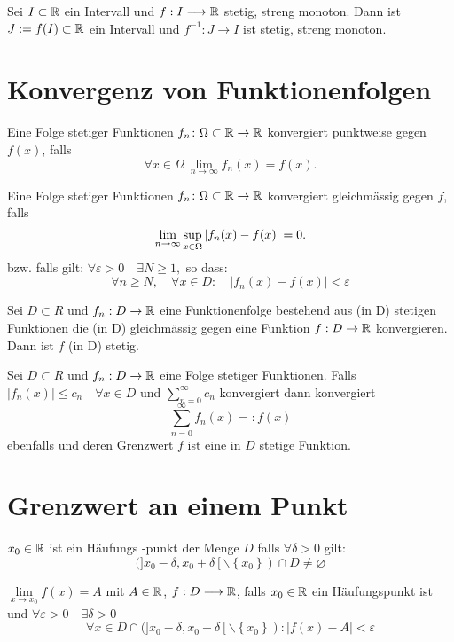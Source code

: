 \Satz[Umkehrabbildung] Sei $I \subset \mathbb{R}$ ein Intervall und $f: I \longrightarrow \mathbb{R}$ stetig, streng monoton. Dann ist $J:=f(I) \subset \mathbb{R}$ ein Intervall und $f^{-1}: J \longrightarrow I$ ist stetig, streng monoton.

\section{Konvergenz von Funktionenfolgen}

\Def[Punktweise] Eine Folge stetiger Funktionen $f_n\colon\Omega\subset\mathbb{R}\to\mathbb{R}$
konvergiert punktweise gegen $f(x)$, falls
\[
\forall x\in\Omega \ \lim_{n\to\infty} f_n(x) = f(x).
\]

\Def[Gleichmässig] Eine Folge stetiger Funktionen $f_n\colon\Omega\subset\mathbb{R}\to\mathbb{R}$
konvergiert gleichmässig gegen $f$, falls
\[
\lim_{n\to\infty} \sup_{x\in\Omega} \left\lvert f_n(x)-f(x) \right\rvert = 0.
\]
bzw. falls gilt: $\forall \varepsilon>0  \quad \exists N \geqslant 1,$ so dass:
$$
\forall n \geqslant N, \quad \forall x \in D: \quad\left|f_{n}(x)-f(x)\right|<\varepsilon
$$

 Sei $D \subset R$ und $f_{n}: D \rightarrow \mathbb{R}$ eine Funktionenfolge bestehend aus (in
D) stetigen Funktionen die (in D) gleichmässig gegen eine Funktion $f: D \rightarrow \mathbb{R}$ konvergieren. Dann ist $f$ (in D) stetig.

 Sei $D \subset R$ und $f_{n}: D \rightarrow \mathbb{R}$ eine Folge stetiger Funktionen. Falls  $\left|f_{n}(x)\right| \leqslant c_{n} \quad \forall x \in D$ und $\sum_{n=0}^{\infty} c_{n}$ konvergiert dann konvergiert 
$$\sum\limits_{n=0}^{\infty} f_n(x)  =: f(x)$$
ebenfalls und deren Grenzwert $f$ ist eine in $D$ stetige Funktion.

\section{Grenzwert an einem Punkt}

\Def[Häufungspunkt] $x_{0} \in \mathbb{R}$ ist ein Häufungs -punkt der Menge $D$ falls $\forall \delta>0$ gilt:
$$(]x_{0}-\delta, x_{0}+\delta\left[\backslash\left\{x_{0}\right\}\right) \cap D \neq \varnothing$$

\Def[Grenzwert] $\lim \limits_{x \rightarrow x_0} f(x) = A$ 
mit $A \in \mathbb{R}$, $f: D \longrightarrow \mathbb{R}$, falls $x_0 \in \mathbb{R}$ ein Häufungspunkt ist und $\forall \varepsilon>0 \quad \exists \delta>0$
$$\forall x \in D \cap(] x_{0}-\delta, x_{0}+\delta\left[\backslash\left\{x_{0}\right\}\right):|f(x)-A|<\varepsilon$$


